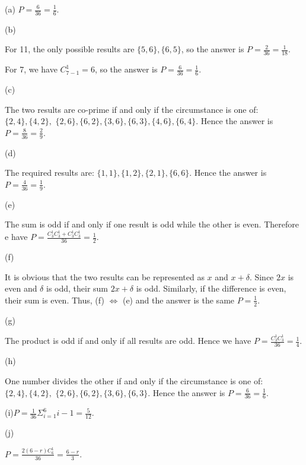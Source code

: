 \begin{solution}
(a) $P=\frac{6}{36}=\frac{1}{6}$.

(b)

For 11, the only possible results are $\{5, 6\}, \{6, 5\}$, so the answer is $P=\frac{2}{36}=\frac{1}{18}$.

For 7, we have $C_{7-1}^{1}=6$, so the answer is $P=\frac{6}{36}=\frac{1}{6}$.

(c)

The two results are co-prime if and only if the circumstance is one of: $\{2, 4\}, \{4, 2\},$ $\{2, 6\}, \{6, 2\}, \{3, 6\}, \{6, 3\}, \{4, 6\}, \{6, 4\}$. Hence the answer is $P=\frac{8}{36}=\frac{2}{9}$.

(d)

The required results are: $\{1, 1\}, \{1, 2\}, \{2, 1\}, \{6, 6\}$. Hence the answer is $P=\frac{4}{36}=\frac{1}{9}$.

(e)

The sum is odd if and only if one result is odd while the other is even. Therefore e have $P=\frac{C_{3}^{1}C_{3}^{1}+C_{3}^{1}C_{3}^{1}}{36}=\frac{1}{2}$.

(f)

It is obvious that the two results can be represented as $x$ and $x+\delta$. Since $2x$ is even and $\delta$ is odd, their sum $2x+\delta$ is odd. Similarly, if the difference is even, their sum is even. Thus, (f) $\iff$ (e) and the answer is the same $P=\frac{1}{2}$.

(g)

The product is odd if and only if all results are odd. Hence we have $P=\frac{C_{3}^{1}C_{3}^{1}}{36}=\frac{1}{4}$.

(h)

One number divides the other if and only if the circumstance is one of: $\{2, 4\}, \{4, 2\},$ $\{2, 6\}, \{6, 2\}, \{3, 6\}, \{6, 3\}$. Hence the answer is $P=\frac{6}{36}=\frac{1}{6}$.

(i)$P=\frac{1}{36}\Sigma_{i=1}^{6}i-1=\frac{5}{12}$.

(j)

$P=\frac{2(6-r)C_{6}^{1}}{36}=\frac{6-r}{3}$.
\end{solution}